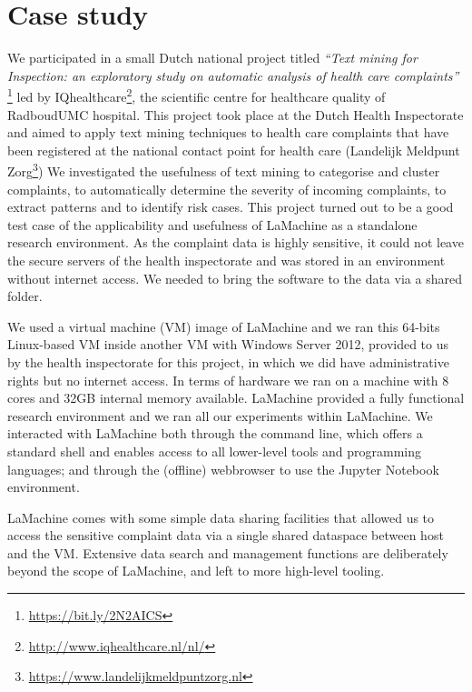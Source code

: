 \documentclass[a4paper,11pt]{article}
\begin{document}
\section{Case study}\label{sec-case}

We participated in a small Dutch national project titled \emph{``Text mining for Inspection: an exploratory study on
automatic analysis of health care complaints''} \footnote{\url{https://bit.ly/2N2AICS}} %
led by IQhealthcare\footnote{\url{http://www.iqhealthcare.nl/nl/}}, the scientific centre for healthcare quality of RadboudUMC hospital.
This project took place at the Dutch Health Inspectorate and aimed to apply text mining techniques to health care
complaints that have been registered at the national contact point for health care (Landelijk Meldpunt
Zorg\footnote{\url{https://www.landelijkmeldpuntzorg.nl}})
We investigated the usefulness of text mining to categorise and cluster complaints, to automatically determine the
severity of incoming complaints, to extract patterns  and to identify risk cases. This project turned out to be a good
test case of the applicability and usefulness of LaMachine as a standalone research environment.
As the complaint data is highly sensitive, it could not leave the secure servers of the health inspectorate and was
stored in an environment without internet access. We needed to bring the software to the data via a shared folder.

We used a virtual machine (VM) image of LaMachine and we ran this 64-bits Linux-based VM inside another
VM with Windows Server 2012, provided to us by the health inspectorate for this project, in which we did have administrative
rights but no internet access. In terms of hardware we ran on a machine with 8 cores and  32GB internal memory available.
LaMachine provided a fully functional research environment and we ran all our experiments within LaMachine. We interacted with LaMachine both through the command line, which offers a standard
shell and enables access to all lower-level tools and programming languages; and through the (offline) webbrowser to use
the Jupyter Notebook environment.

LaMachine comes with some simple data sharing facilities that allowed us to access the sensitive complaint data via a
single shared dataspace between host and the VM. Extensive data search and management functions are deliberately beyond the scope of LaMachine, and left to more high-level tooling.
\end{document}
